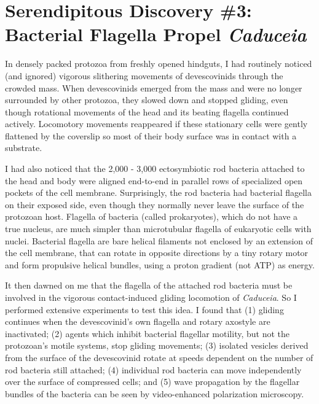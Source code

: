 \documentclass[authordate, anecdote]{jote-new-article}
\begin{document}
	\section{Serendipitous Discovery \#3: Bacterial Flagella Propel \emph{Caduceia} }







	In densely packed protozoa from freshly opened hindguts, I had routinely noticed (and ignored) vigorous slithering movements of devescovinids through the crowded mass. When devescovinids emerged from the mass and were no longer surrounded by other protozoa, they slowed down and stopped gliding, even though rotational movements of the head and its beating flagella continued actively. Locomotory movements reappeared if these stationary cells were gently flattened by the coverslip so most of their body surface was in contact with a substrate.







	I had also noticed that the 2,000 - 3,000 ectosymbiotic rod bacteria attached to the head and body were aligned end-to-end in parallel rows of specialized open pockets of the cell membrane. Surprisingly, the rod bacteria had bacterial flagella on their exposed side, even though they normally never leave the surface of the protozoan host. Flagella of bacteria (called prokaryotes), which do not have a true nucleus, are much simpler than microtubular flagella of eukaryotic cells with nuclei. Bacterial flagella are bare helical filaments not enclosed by an extension of the cell membrane, that can rotate in opposite directions by a tiny rotary motor and form propulsive helical bundles, using a proton gradient (not ATP) as energy.







	It then dawned on me that the flagella of the attached rod bacteria must be involved in the vigorous contact-induced gliding locomotion of \emph{Caduceia}. So I performed extensive experiments to test this idea. I found that (1) gliding continues when the devescovinid's own flagella and rotary axostyle are inactivated; (2) agents which inhibit bacterial flagellar motility, but not the protozoan's motile systems, stop gliding movements; (3) isolated vesicles derived from the surface of the devescovinid rotate at speeds dependent on the number of rod bacteria still attached; (4) individual rod bacteria can move independently over the surface of compressed cells; and (5) wave propagation by the flagellar bundles of the bacteria can be seen by video-enhanced polarization microscopy.
\end{document}

